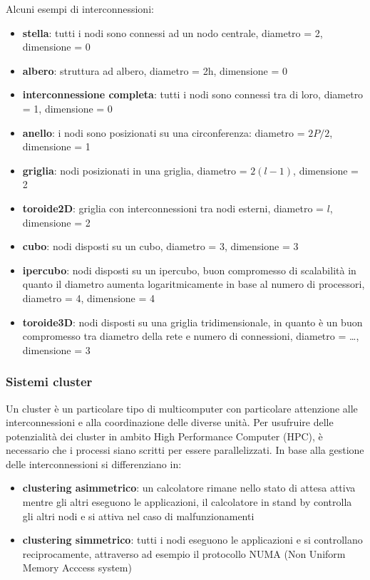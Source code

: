 \documentclass[a4paper]{article}
\begin{document}
\newpage

Alcuni esempi di interconnessioni:
\begin{itemize}
	\item \textbf{stella}: tutti i nodi sono connessi ad un nodo centrale, diametro = 2, dimensione = 0
	\item \textbf{albero}: struttura ad albero, diametro = 2h, dimensione = 0 
	\item \textbf{interconnessione completa}: tutti i nodi sono connessi tra di loro, diametro = 1, dimensione = 0
	\item \textbf{anello}: i nodi sono posizionati su una circonferenza: diametro = \(2P/2\), dimensione = 1
	\item \textbf{griglia}: nodi posizionati in una griglia, diametro = \(2(l-1)\), dimensione = 2
	\item \textbf{toroide2D}: griglia con interconnessioni tra nodi esterni, diametro = \(l\), dimensione = 2
	\item \textbf{cubo}: nodi disposti su un cubo, diametro = 3, dimensione = 3
	\item \textbf{ipercubo}: nodi disposti su un ipercubo, buon compromesso di scalabilità in quanto il diametro aumenta
	logaritmicamente in base al numero di processori, diametro = 4, dimensione = 4
	\item \textbf{toroide3D}: nodi disposti su una griglia tridimensionale, in quanto è un buon compromesso tra diametro della
	rete e numero di connessioni, diametro = \dots, dimensione = 3
\end{itemize}

\subsubsection*{Sistemi cluster}
Un cluster è un particolare tipo di multicomputer con particolare attenzione alle interconnessioni e alla coordinazione delle
diverse unità. Per usufruire delle potenzialità dei cluster in ambito High Performance Computer (HPC), è necessario che i processi
siano scritti per essere parallelizzati. In base alla gestione delle interconnessioni si differenziano in:
\begin{itemize}
	\item \textbf{clustering asimmetrico}: un calcolatore rimane nello stato di attesa attiva mentre gli altri eseguono le
	applicazioni, il calcolatore in stand by controlla gli altri nodi e si attiva nel caso di malfunzionamenti
	\item \textbf{clustering simmetrico}: tutti i nodi eseguono le applicazioni e si controllano reciprocamente, attraverso ad
	esempio il protocollo NUMA (Non Uniform Memory Acccess system)
\end{itemize}
\end{document}
